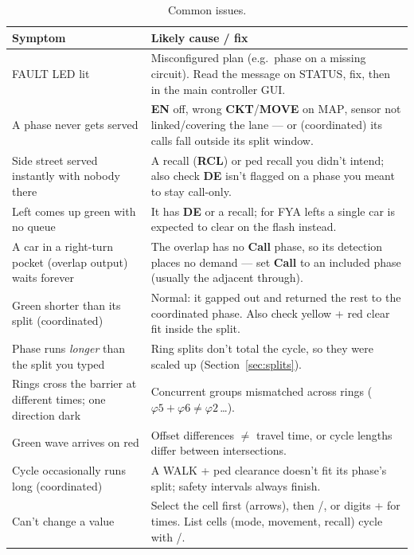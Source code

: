 \documentclass[11pt]{article}
\newcommand{\ph}[1]{\ensuremath{\varphi#1}}
\newcommand{\field}[1]{\textsf{\textbf{#1}}}
\newcommand{\key}[1]{\fcolorbox{inkhead}{gray!12}{\small\textsf{#1}}}
\newcommand{\screen}[1]{\textsc{#1}}
\begin{document}
\begin{table}[H]
\centering\small
\begin{tabular}{@{}p{6.2cm}p{8.6cm}@{}}
\toprule
\textbf{Symptom} & \textbf{Likely cause / fix} \\
\midrule
FAULT LED lit &
  Misconfigured plan (e.g.\ phase on a missing circuit). Read the message on
  \screen{STATUS}, fix, then \key{Clear Faults} in the main controller GUI. \\
A phase never gets served &
  \field{EN} off, wrong \field{CKT}/\field{MOVE} on \screen{MAP}, sensor not
  linked/covering the lane — or (coordinated) its calls fall outside its split
  window. \\
Side street served instantly with nobody there &
  A recall (\field{RCL}) or ped recall you didn't intend; also check \field{DE}
  isn't flagged on a phase you meant to stay call-only. \\
Left comes up green with no queue &
  It has \field{DE} or a recall; for FYA lefts a single car is expected to clear
  on the flash instead. \\
A car in a right-turn pocket (overlap output) waits forever &
  The overlap has no \field{Call} phase, so its detection places no demand — set
  \field{Call} to an included phase (usually the adjacent through). \\
Green shorter than its split (coordinated) &
  Normal: it gapped out and returned the rest to the coordinated phase. Also check
  yellow + red clear fit inside the split. \\
Phase runs \emph{longer} than the split you typed &
  Ring splits don't total the cycle, so they were scaled up
  (Section~\ref{sec:splits}). \\
Rings cross the barrier at different times; one direction dark &
  Concurrent groups mismatched across rings ($\ph{5}+\ph{6}\ne\ph{2}$\,\ldots). \\
Green wave arrives on red &
  Offset differences $\ne$ travel time, or cycle lengths differ between
  intersections. \\
Cycle occasionally runs long (coordinated) &
  A WALK + ped clearance doesn't fit its phase's split; safety intervals always
  finish. \\
Can't change a value &
  Select the cell first (arrows), then \key{+}/\key{−}, or digits + \key{ENTER}
  for times. List cells (mode, movement, recall) cycle with \key{ENTER}/\key{+}. \\
\bottomrule
\end{tabular}
\caption{Common issues.}
\label{tab:trouble}
\end{table}
\end{document}
